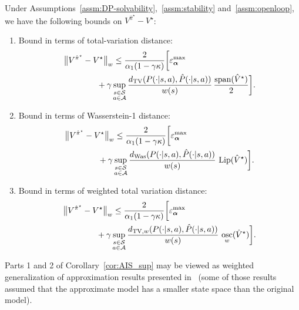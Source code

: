 \documentclass[letterpaper, 10pt]{IEEEtran}
\newcommand*\ALPHABET{\mathcal}
\newcommand\dTV{d_{\mathrm{TV}}}
\newcommand\dTVw{d_{\mathrm{TV},w}}
\newcommand\dWas{d_{\mathrm{Was}}}
\DeclareMathOperator{\Lip}{Lip}
\DeclareMathOperator{\Span}{span}
\DeclareMathOperator{\Osc}{osc}
\begin{document}
\begin{corollary}\label{cor:AIS_sup}
    Under Assumptions~\ref{assm:DP-solvability},~\ref{assm:stability} and~\ref{assm:openloop}, we have the following bounds on $V^{\hat \pi^\star} - V^\star$:
    \begin{enumerate}
        \item Bound in terms of total-variation distance:
        \begin{align*}
          \bigl\| V^{\hat \pi^\star} - V^\star \bigr\|_{w}
          &\le
          \frac{2}{\alpha_1(1 - \gamma\kappa) }
          \biggl[ \varepsilon_{\boldsymbol{\alpha}}^{\max} \\
          &  \hskip -2em
          + \gamma \sup_{\substack{ s \in \ALPHABET S \\ a \in \ALPHABET A}}
          \frac{\dTV (P (\cdot | s,a), \hat P(\cdot | s,a))}{w(s)} \, \frac{\Span(\hat V^\star)}{2}
          \biggr].
        \end{align*}
        \item Bound in terms of Wasserstein-1 distance:
        \begin{align*}
          \bigl\| V^{\hat \pi^\star} - V^\star \bigr\|_w
          &\le
          \frac{2}{\alpha_1(1 - \gamma\kappa) }
          \biggl[ \varepsilon_{\boldsymbol{\alpha}}^{\max} \\
          &  \hskip -2em
          + \gamma \sup_{\substack{ s \in \ALPHABET S \\ a \in \ALPHABET A}}
          \frac{\dWas(P (\cdot | s,a), \hat P(\cdot | s,a))}{w(s)} \, \Lip(\hat V^\star)
          \biggr].
        \end{align*}
        \item Bound in terms of weighted total variation distance:
        \begin{align*}
          \bigl\| V^{\hat \pi^\star} - V^\star \bigr\|_{w}
          &\le
          \frac{2}{\alpha_1(1 - \gamma\kappa) }
          \biggl[ \varepsilon_{\boldsymbol{\alpha}}^{\max} \\
          &  \hskip -2em
          + \gamma \sup_{\substack{ s \in \ALPHABET S \\ a \in \ALPHABET A}}
          \frac{\dTVw (P (\cdot | s,a), \hat P(\cdot | s,a))}{w(s)} \, \Osc_w(\hat V^\star)
          \biggr].
        \end{align*}
    \end{enumerate}
\end{corollary}

Parts 1 and 2 of Corollary~\ref{cor:AIS_sup} may be viewed as weighted generalization of approximation results presented in~\cite{muller1997,abel2016near,gelada2019deepmdp} (some of those results assumed that the approximate model has a smaller state space than the original model).
\end{document}
